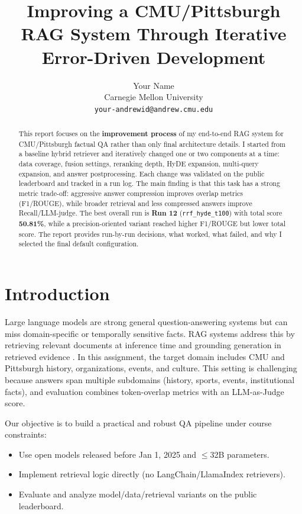 \documentclass[11pt,twocolumn]{article}
\title{Improving a CMU/Pittsburgh RAG System Through Iterative Error-Driven Development}
\author{
  Your Name \\
  Carnegie Mellon University \\
  \texttt{your-andrewid@andrew.cmu.edu}
}
\begin{document}
\maketitle

\begin{abstract}
This report focuses on the \textbf{improvement process} of my end-to-end RAG system for CMU/Pittsburgh factual QA rather than only final architecture details. I started from a baseline hybrid retriever and iteratively changed one or two components at a time: data coverage, fusion settings, reranking depth, HyDE expansion, multi-query expansion, and answer postprocessing. Each change was validated on the public leaderboard and tracked in a run log. The main finding is that this task has a strong metric trade-off: aggressive answer compression improves overlap metrics (F1/ROUGE), while broader retrieval and less compressed answers improve Recall/LLM-judge. The best overall run is \textbf{Run 12} (\texttt{rrf\_hyde\_t100}) with total score \textbf{50.81\%}, while a precision-oriented variant reached higher F1/ROUGE but lower total score. The report provides run-by-run decisions, what worked, what failed, and why I selected the final default configuration.
\end{abstract}

\section{Introduction}
Large language models are strong general question-answering systems but can miss domain-specific or temporally sensitive facts. RAG systems address this by retrieving relevant documents at inference time and grounding generation in retrieved evidence \citep{lewis2020rag}. In this assignment, the target domain includes CMU and Pittsburgh history, organizations, events, and culture. This setting is challenging because answers span multiple subdomains (history, sports, events, institutional facts), and evaluation combines token-overlap metrics with an LLM-as-Judge score.

Our objective is to build a practical and robust QA pipeline under course constraints:
\begin{itemize}
    \item Use open models released before Jan 1, 2025 and $\leq$32B parameters.
    \item Implement retrieval logic directly (no LangChain/LlamaIndex retrievers).
    \item Evaluate and analyze model/data/retrieval variants on the public leaderboard.
\end{itemize}
\end{document}
